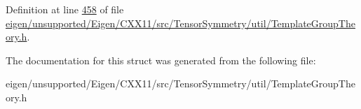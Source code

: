 Definition at line \hyperlink{eigen_2unsupported_2_eigen_2_c_x_x11_2src_2_tensor_symmetry_2util_2_template_group_theory_8h_source_l00458}{458} of file \hyperlink{eigen_2unsupported_2_eigen_2_c_x_x11_2src_2_tensor_symmetry_2util_2_template_group_theory_8h_source}{eigen/unsupported/\+Eigen/\+C\+X\+X11/src/\+Tensor\+Symmetry/util/\+Template\+Group\+Theory.\+h}.



The documentation for this struct was generated from the following file\+:\begin{DoxyCompactItemize}
\item 
eigen/unsupported/\+Eigen/\+C\+X\+X11/src/\+Tensor\+Symmetry/util/\+Template\+Group\+Theory.\+h\end{DoxyCompactItemize}
